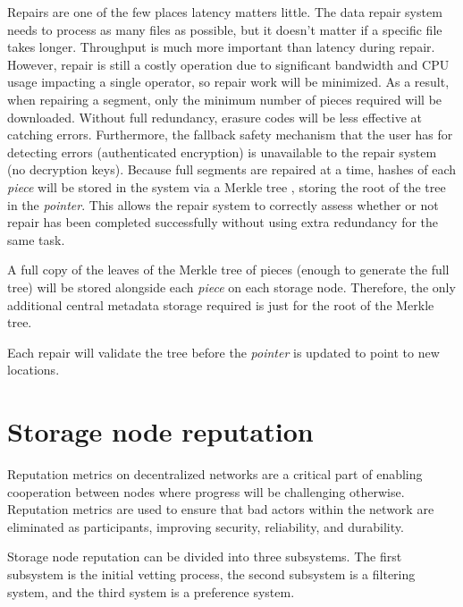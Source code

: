 \documentclass[11pt,fleqn,openany]{book}
\begin{document}
Repairs are one of the few places latency matters little. The data repair system
needs to process as many files as possible, but it doesn't matter if
a specific file takes longer. Throughput is much more important than
latency during repair. However, repair
is still a costly operation due to significant bandwidth and CPU usage
impacting a single operator, so repair work will be minimized.
As a result, when repairing a segment,
only the minimum number of pieces required will be downloaded.
Without full redundancy, erasure codes will be less effective at catching
errors. Furthermore, the fallback safety mechanism that the user has for detecting
errors (authenticated encryption) is unavailable to the repair system (no
decryption keys).
Because full segments are repaired at a time, hashes of
each {\em piece} will be stored in the system via a Merkle tree
\cite{merkle-tree}, storing the root of the tree in the {\em pointer}. This allows
the repair system to correctly assess whether or not repair has been completed
successfully without using extra redundancy for the same task.

A full copy of the leaves of the Merkle tree of pieces (enough to generate
the full tree) will be stored alongside each {\em piece} on each storage node.
Therefore, the only additional central metadata storage required is just for
the root of the Merkle tree.

Each repair will validate the tree before the {\em pointer} is updated to
point to new locations.

\section{Storage node reputation}\label{sec:concrete-reputation}

Reputation metrics on decentralized networks are a critical part of
enabling cooperation
between nodes
where progress will be challenging otherwise. Reputation metrics
are used to ensure that bad actors
within the network are eliminated as participants, improving security,
reliability, and durability.

Storage node reputation can be divided into three subsystems. The first
subsystem is the initial vetting process, the second subsystem is a filtering
system, and the third system is a preference system.
\end{document}
